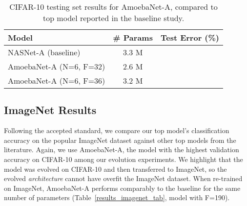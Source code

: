 \documentclass[letterpaper]{article} \usepackage{aaai19}  \usepackage{times}  \usepackage{helvet}  \usepackage{courier}  \usepackage{graphicx}  \frenchspacing
\begin{document}
\begin{table}[ht]
\caption{CIFAR-10 testing set results for \mbox{AmoebaNet-A}, compared to top model reported in the baseline study.}
\label{evol_rl_semi_tab}
\centering
\begin{tabular}{lcc}
\toprule
Model                       &  \# Params & Test Error (\%)   \\
\midrule
NASNet-A (baseline)    & 3.3 M   &   \\
AmoebaNet-A (N=6, F=32)   & 2.6 M   &   \\
AmoebaNet-A (N=6, F=36)   & 3.2 M   &   \\
\bottomrule
\end{tabular}
\end{table}


\subsection{ImageNet Results}


Following the accepted standard, we compare our top model's classification accuracy on the popular ImageNet dataset against other top models from the literature. Again, we use \mbox{AmoebaNet-A}, the model with the highest validation accuracy on CIFAR-10 among our evolution experiments. We highlight that the model was evolved on CIFAR-10 and then transferred to ImageNet, so the evolved \textit{architecture} cannot have overfit the ImageNet dataset. When re-trained on ImageNet, \mbox{AmoebaNet-A} performs comparably to the baseline for the same number of parameters (Table~\ref{results_imagenet_tab}, model with F=190).
\end{document}
